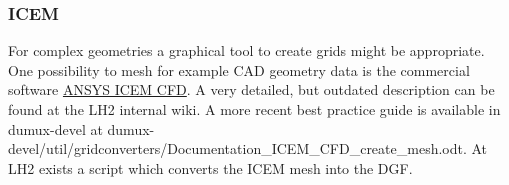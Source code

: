 \subsubsection{ICEM}
For complex geometries a graphical tool to create grids might be appropriate. One possibility to mesh for example CAD
geometry data is the commercial software \href{http://www.ansys.com/Products/Other+Products/ANSYS+ICEM+CFD/}{ANSYS ICEM
CFD}. A very detailed, but outdated description can be found at the LH2 internal wiki. A more recent best practice guide is available
in dumux-devel at dumux-devel/util/gridconverters/Documentation\_ICEM\_CFD\_create\_mesh.odt. At LH2 exists a script which converts the ICEM mesh into the DGF.
